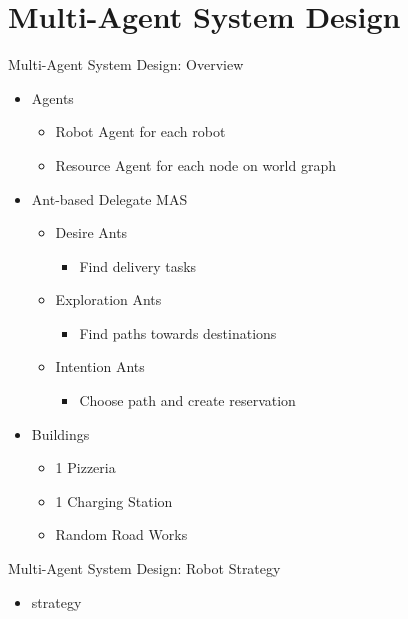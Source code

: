 \section{Multi-Agent System Design}

\begin{frame}{Multi-Agent System Design: Overview}
    \begin{itemize}
        \item Agents
            \begin{itemize}
                \item Robot Agent for each robot
                \item Resource Agent for each node on world graph
            \end{itemize}

        \item Ant-based Delegate MAS
            \begin{itemize}
                \item Desire Ants
                \begin{itemize}
                    \item Find delivery tasks
                \end{itemize}

                \item Exploration Ants
                \begin{itemize}
                    \item Find paths towards destinations
                \end{itemize}

                \item Intention Ants
                \begin{itemize}
                    \item Choose path and create reservation
                \end{itemize}
            \end{itemize}

        \item Buildings
            \begin{itemize}
                \item 1 Pizzeria
                \item 1 Charging Station
                \item Random Road Works
            \end{itemize}
    \end{itemize}
\end{frame}

\begin{frame}{Multi-Agent System Design: Robot Strategy}
    \begin{itemize}
        \item strategy
    \end{itemize}
\end{frame}

